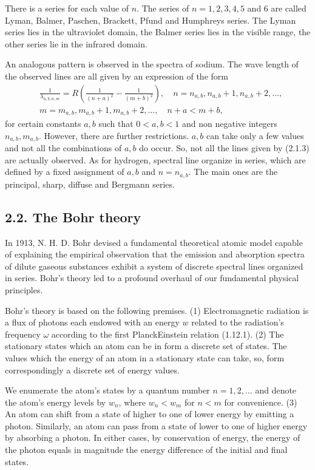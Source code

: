 \documentclass{article}
\begin{document}
There is a series for each value of $n$. The series of $n=1,2,3,4,5$ and 6 are called Lyman, Balmer, Paschen, Brackett, Pfund and Humphreys series. The Lyman series lies in the ultraviolet domain, the Balmer series lies in the visible range, the other series lie in the infrared domain.

An analogous pattern is observed in the spectra of sodium. The wave length of the observed lines are all given by an expression of the form
$$
\begin{align*}
& \frac{1}{\lambda_{a, b ; n, m}}=R\left(\frac{1}{(n+a)^{2}}-\frac{1}{(m+b)^{2}}\right), \quad n=n_{a, b}, n_{a, b}+1, n_{a, b}+2, \ldots,  \tag{2.1.3}\\
& m=m_{a, b}, m_{a, b}+1, m_{a, b}+2, \ldots, \quad n+a<m+b,
\end{align*}
$$
for certain constants $a, b$ such that $0<a, b<1$ and non negative integers $n_{a, b}, m_{a, b}$. However, there are further restrictions. $a, b$ can take only a few values and not all the combinations of $a, b$ do occur. So, not all the lines given by (2.1.3) are actually observed. As for hydrogen, spectral line organize in series, which are defined by a fixed assignment of $a, b$ and $n=n_{a, b}$. The main ones are the principal, sharp, diffuse and Bergmann series.

\subsection*{2.2. The Bohr theory}

In 1913, N. H. D. Bohr devised a fundamental theoretical atomic model capable of explaining the empirical observation that the emission and absorption spectra of dilute gaseous substances exhibit a system of discrete spectral lines organized in series. Bohr's theory led to a profound overhaul of our fundamental physical principles.

Bohr's theory is based on the following premises.
(1) Electromagnetic radiation is a flux of photons each endowed with an energy $w$ related to the radiation's frequency $\omega$ according to the first PlanckEinstein relation (1.12.1).
(2) The stationary states which an atom can be in form a discrete set of states. The values which the energy of an atom in a stationary state can take, so, form correspondingly a discrete set of energy values.

We enumerate the atom's states by a quantum number $n=1,2, \ldots$ and denote the atom's energy levels by $w_{n}$, where $w_{n}<w_{m}$ for $n<m$ for convenience.
(3) An atom can shift from a state of higher to one of lower energy by emitting a photon. Similarly, an atom can pass from a state of lower to one of higher energy by absorbing a photon. In either cases, by conservation of energy, the energy of the photon equals in magnitude the energy difference of the initial and final states.
\end{document}
